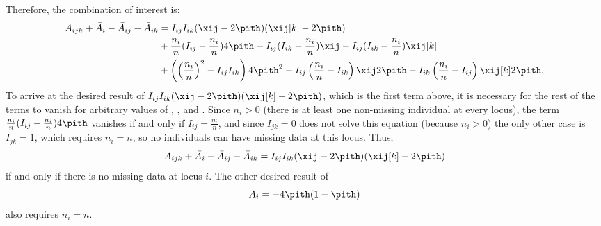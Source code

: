 \documentclass[11pt]{article}
\begin{document}
\begin{appendices}
  Therefore, the combination of interest is:
  \begin{align*}
    A_{ijk} + \bar{A}_i - \bar{A}_{ij}  - \bar{A}_{ik}
    &=
      I_{ij} I_{ik} (\xij - 2 \pith) (\xij[k] - 2 \pith )
      \\
    &+ \frac{n_i}{n} ( I_{ij} - \frac{n_i}{n} ) 4 \pith
      - I_{ij} ( I_{ik} - \frac{n_i}{n} ) \xij
      - I_{ij} ( I_{ik} - \frac{n_i}{n} ) \xij[k] \\
    &+ \left( \left( \frac{n_i}{n} \right)^2 -  I_{ij} I_{ik} \right) 4 \pith^2
      - I_{ij} \left( \frac{n_i}{n} - I_{ik} \right) \xij 2 \pith
      - I_{ik} \left( \frac{n_i}{n} - I_{ij} \right) \xij[k] 2 \pith
      .
  \end{align*}
  To arrive at the desired result of $I_{ij} I_{ik} (\xij - 2 \pith) (\xij[k] - 2 \pith )$, which is the first term above, it is necessary for the rest of the terms to vanish for arbitrary values of \pith, \xij, and \xij[k].
  Since $n_i > 0$ (there is at least one non-missing individual at every locus), the term $\frac{n_i}{n} ( I_{ij} - \frac{n_i}{n} ) 4 \pith$ vanishes if and only if $I_{ij} = \frac{n_i}{n}$, and since $I_{jk}=0$ does not solve this equation (because $n_i > 0$) the only other case is $I_{jk}=1$, which requires $n_i=n$, so no individuals can have missing data at this locus.
  Thus,
  $$
  A_{ijk} + \bar{A}_i - \bar{A}_{ij}  - \bar{A}_{ik}
  =
  I_{ij} I_{ik} (\xij - 2 \pith) (\xij[k] - 2 \pith )
  $$
  if and only if there is no missing data at locus $i$.
  The other desired result of
  $$
  \bar{A}_i
  =
  - 4 \pith ( 1 - \pith )
  $$
  also requires $n_i = n$.


\end{appendices}
\end{document}
